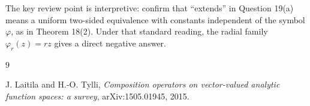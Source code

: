 \documentclass[11pt]{article}
\begin{document}
The key review point is interpretive: confirm that ``extends'' in Question
19(a) means a uniform two-sided equivalence with constants independent of the
symbol \(\varphi\), as in Theorem 18(2).  Under that standard reading, the
radial family \(\varphi_r(z)=rz\) gives a direct negative answer.

\begin{thebibliography}{9}

J. Laitila and H.-O. Tylli,
\emph{Composition operators on vector-valued analytic function spaces: a survey},
arXiv:1505.01945, 2015.

\end{thebibliography}
\end{document}
